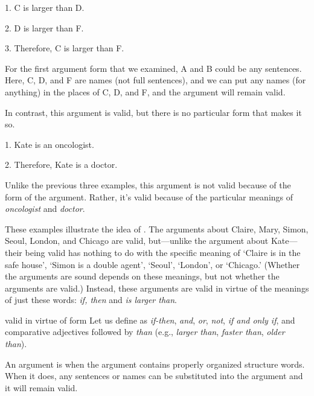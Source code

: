 	\noindent\begin{minipage}{0.99\textwidth}
	\begin{earg}
		\item[1.] C is larger than D.
		\item[2.] D is larger than F.
		\item[3.] Therefore, C is larger than F. 
	\end{earg}
	\end{minipage}

\noindent For the first argument form that we examined, A and B could be any sentences. Here, C, D, and F are names (not full sentences), and we can put any names (for anything) in the places of C, D, and F, and the argument will remain valid.

In contrast, this argument is valid, but there is no particular form that makes it so.
	\begin{earg}
		\item[1.] Kate is an oncologist.
		\item[2.] Therefore, Kate is a doctor.
	\end{earg}
Unlike the previous three examples, this argument is not valid because of the form of the argument. Rather, it's valid because of the particular meanings of \textit{oncologist} and \textit{doctor}. 

These examples illustrate the idea of . The arguments about Claire, Mary, Simon, Seoul, London, and Chicago are valid, but---unlike the argument about Kate---their being valid has nothing to do with the specific meaning of `Claire is in the safe house', `Simon is a double agent', `Seoul', `London', or `Chicago.' (Whether the arguments are sound depends on these meanings, but not whether the arguments are valid.) Instead, these arguments are valid in virtue of the meanings of just these words: \textit{if, then} and \textit{is larger than}.

\begin{factboxy}{valid in virtue of form}
Let us define  as \textit{if-then}, \textit{and}, \textit{or}, \textit{not}, \textit{if and only if}, and comparative adjectives followed by \textit{than} (e.g., \textit{larger than}, \textit{faster than}, \textit{older than}).

An argument is  when the argument contains properly organized structure words. When it does, any sentences or names can be substituted into the argument and it will remain valid. 
\end{factboxy}

